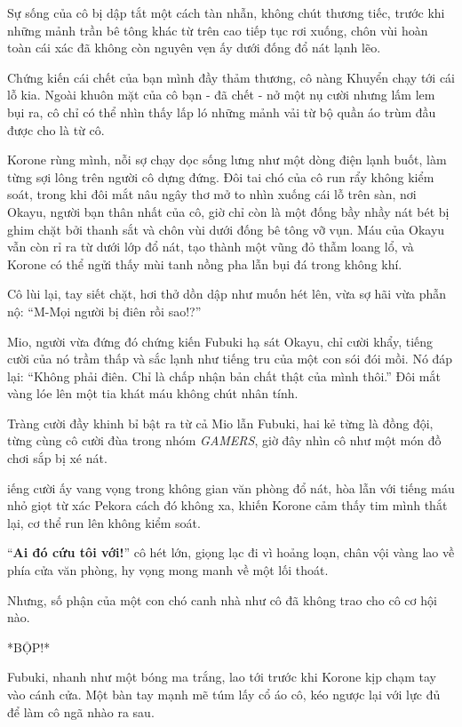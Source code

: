 \documentclass[../main.tex]{subfiles}
\begin{document}
Sự sống của cô bị dập tắt một cách tàn nhẫn, không chút thương tiếc, trước khi những mảnh trần bê tông khác từ trên cao tiếp tục rơi xuống, chôn vùi hoàn toàn cái xác đã không còn nguyên vẹn ấy dưới đống đổ nát lạnh lẽo.

Chứng kiến cái chết của bạn mình đầy thảm thương, cô nàng Khuyển chạy tới cái lỗ kia. Ngoài khuôn mặt của cô bạn - đã chết - nở một nụ cười nhưng lấm lem bụi ra, cô chỉ có thể nhìn thấy lấp ló những mảnh vải từ bộ quần áo trùm đầu được cho là từ cô.

Korone rùng mình, nỗi sợ chạy dọc sống lưng như một dòng điện lạnh buốt, làm từng sợi lông trên người cô dựng đứng. Đôi tai chó của cô run rẩy không kiểm soát, trong khi đôi mắt nâu ngây thơ mở to nhìn xuống cái lỗ trên sàn, nơi Okayu, người bạn thân nhất của cô, giờ chỉ còn là một đống bầy nhầy nát bét bị ghim chặt bởi thanh sắt và chôn vùi dưới đống bê tông vỡ vụn. Máu của Okayu vẫn còn rỉ ra từ dưới lớp đổ nát, tạo thành một vũng đỏ thẫm loang lổ, và Korone có thể ngửi thấy mùi tanh nồng pha lẫn bụi đá trong không khí.

Cô lùi lại, tay siết chặt, hơi thở dồn dập như muốn hét lên, vừa sợ hãi vừa phẫn nộ: ``M-Mọi người bị điên rồi sao!?''

Mio,  người vừa đứng đó chứng kiến Fubuki hạ sát Okayu, chỉ cười khẩy, tiếng cười của nó trầm thấp và sắc lạnh như tiếng tru của một con sói đói mồi. Nó đáp lại: ``Không phải điên. Chỉ là chấp nhận bản chất thật của mình thôi.'' Đôi mắt vàng lóe lên một tia khát máu không chút nhân tính.

Tràng cười đầy khinh bỉ bật ra từ cả Mio lẫn Fubuki, hai kẻ từng là đồng đội, từng cùng cô cười đùa trong nhóm \textit{GAMERS}, giờ đây nhìn cô như một món đồ chơi sắp bị xé nát.

iếng cười ấy vang vọng trong không gian văn phòng đổ nát, hòa lẫn với tiếng máu nhỏ giọt từ xác Pekora cách đó không xa, khiến Korone cảm thấy tim mình thắt lại, cơ thể run lên không kiểm soát.

``\textbf{Ai đó cứu tôi với!}'' cô hét lớn, giọng lạc đi vì hoảng loạn, chân vội vàng lao về phía cửa văn phòng, hy vọng mong manh về một lối thoát.

Nhưng, số phận của một con chó canh nhà như cô đã không trao cho cô cơ hội nào.

*BỘP!*

Fubuki, nhanh như một bóng ma trắng, lao tới trước khi Korone kịp chạm tay vào cánh cửa. Một bàn tay mạnh mẽ túm lấy cổ áo cô, kéo ngược lại với lực đủ để làm cô ngã nhào ra sau.
\end{document}
